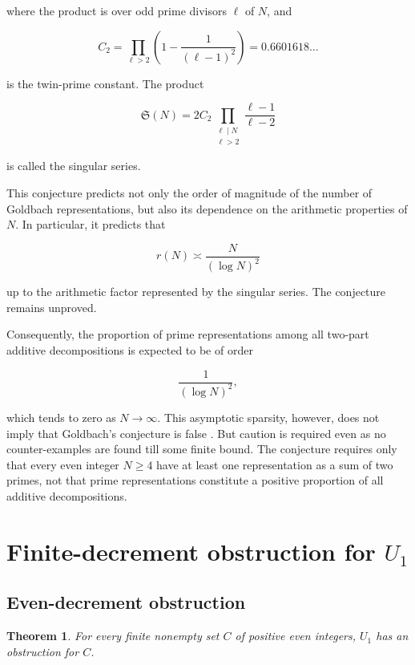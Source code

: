 \documentclass[11pt]{article}
\newtheorem{theorem}{Theorem}
\begin{document}
	where the product is over odd prime divisors \(\ell\) of \(N\), and
	
	$$
	C_2=\prod_{\ell>2}
	\left(1-\frac{1}{(\ell-1)^2}\right)
	=0.6601618\ldots
	$$
	
	is the twin-prime constant. The product
	
	$$
	\mathfrak{S}(N)=
	2C_2\prod_{\substack{\ell\mid N\\ \ell>2}}
	\frac{\ell-1}{\ell-2}
	$$
	
	is called the singular series.
	
	This conjecture predicts not only the order of magnitude of the number of Goldbach representations, but also its dependence on the arithmetic properties of \(N\). In particular, it predicts that
	
	$$
	r(N)\asymp \frac{N}{(\log N)^2}
	$$
	
	up to the arithmetic factor represented by the singular series. The conjecture remains unproved.
	
	
	Consequently, the proportion of prime representations among all two-part additive decompositions is expected to be of order
	
	$$
	\frac{1}{(\log N)^2},
	$$
	
	which tends to zero as \(N\to\infty\). This asymptotic sparsity, however, does not imply that Goldbach's conjecture is false \cite{Vaughan1997,Vaughan2016,MontgomeryVaughan1975}. But caution is required even as no counter-examples are found till some finite bound. The conjecture requires only that every even integer \(N\geq 4\) have at least one representation as a sum of two primes, not that prime representations constitute a positive proportion of all additive decompositions.
	
	
	\section{Finite-decrement obstruction for $U_1$}
	
	\subsection{Even-decrement obstruction}
	
	\begin{theorem}\label{evendecu}
		For every finite nonempty set $C$ of positive even integers,
		$U_1$ has an obstruction for $C$.
	\end{theorem}
	
\end{document}
